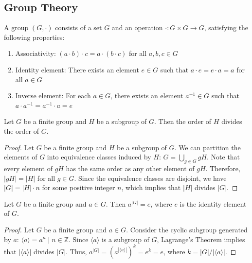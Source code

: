 
\subsection{Group Theory}

\begin{fdefinition}[Group]
    A group $(G,\cdot)$ consists of a set $G$ and an operation $\cdot: G \times G \rightarrow G$, satisfying the following properties:
    \begin{enumerate}
        \item Associativity: $(a \cdot b) \cdot c = a \cdot (b \cdot c)$ for all $a,b,c \in G$
        \item Identity element: There exists an element $e \in G$ such that $a \cdot e = e \cdot a = a$ for all $a \in G$
        \item Inverse element: For each $a \in G$, there exists an element $a^{-1} \in G$ such that $a \cdot a^{-1} = a^{-1} \cdot a = e$
    \end{enumerate}
\end{fdefinition}

\begin{ftheorem}
    Let $G$ be a finite group and $H$ be a subgroup of $G$. Then the order of $H$ divides the order of $G$.
\end{ftheorem}

\begin{proof}
    Let $G$ be a finite group and $H$ be a subgroup of $G$. We can partition the elements of $G$ into equivalence classes induced by $H$: $G = \bigcup_{g \in G} gH$. Note that every element of $gH$ has the same order as any other element of $gH$. Therefore, $|gH| = |H|$ for all $g \in G$. Since the equivalence classes are disjoint, we have $|G| = |H| \cdot n$ for some positive integer $n$, which implies that $|H|$ divides $|G|$.
\end{proof}

\begin{fcorollary}
    Let $G$ be a finite group and $a \in G$. Then $a^{|G|} = e$, where $e$ is the identity element of $G$.
\end{fcorollary}

\begin{proof}
    Let $G$ be a finite group and $a \in G$. Consider the cyclic subgroup generated by $a$: $\langle a \rangle = {a^n \mid n \in \mathbb{Z}}$. Since $\langle a \rangle$ is a subgroup of $G$, Lagrange's Theorem implies that $|\langle a \rangle|$ divides $|G|$. Thus, $a^{|G|} = (a^{|\langle a \rangle|})^{k} = e^k = e$, where $k = |G|/|\langle a \rangle|$.
\end{proof}